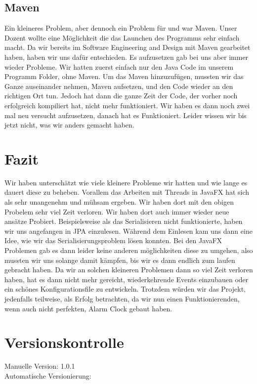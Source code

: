 \documentclass[11pt,titelpage]{scrartcl}
\begin{document}
\subsection{Maven}
Ein kleineres Problem, aber dennoch ein Problem für und war Maven. Unser Dozent wollte eine Möglichkeit die das Launchen des Programms sehr einfach macht. Da wir bereits im Software Engineering and Design mit Maven gearbeitet
haben, haben wir uns dafür entschieden. Es aufzusetzen gab bei uns aber immer wieder Probleme. Wir hatten zuerst einfach nur den Java Code im unserem Programm Folder, ohne Maven. Um das Maven hinzuzufügen, mussten wir das Ganze
auseinander nehmen, Maven aufsetzen, und den Code wieder an den richtigen Ort tun. Jedoch hat dann die ganze Zeit der Code, der vorher noch erfolgreich kompiliert hat, nicht mehr funktioniert. Wir haben es dann noch zwei mal neu
versucht aufzusetzen, danach hat es Funktioniert. Leider wissen wir bis jetzt nicht, was wir anders gemacht haben.

\section{Fazit}
Wir haben unterschätzt wie viele kleinere Probleme wir hatten und wie lange es dauert diese zu beheben. Vorallem das Arbeiten mit Threads in JavaFX hat sich als sehr
unangenehm und mühsam ergeben. Wir haben dort mit den obigen Probelem sehr viel Zeit verloren. Wir haben dort auch immer wieder neue ansätze Probiert. Beispielsweise als das
Serialisieren nicht funktionierte, haben wir uns angefangen in JPA einzulesen. Während dem Einlesen kam uns dann eine Idee, wie wir das Serialisierungsproblem lösen konnten.
Bei den JavaFX Problemen gab es dann leider keine anderen möglichkeiten diese zu umgehen, also mussten wir uns solange damit kämpfen, bis wir es dann endlich zum laufen
gebracht haben.
Da wir an solchen kleineren Problemen dann so viel Zeit verloren haben, hat es dann nicht mehr gereicht, wiederkehrende Events einzubauen oder ein schönes Konfigurationsfile
zu entwickeln.
Trotzdem würden wir das Projekt, jedenfalls teilweise, als Erfolg betrachten, da wir nun einen Funktionierenden, wenn auch nicht perfekten, Alarm Clock gebaut haben.




\section{Versionskontrolle}
Manuelle Version: 1.0.1
\\

\noindent
Automatische Versionierung:
\immediate{}

\immediate{}
\end{document}
